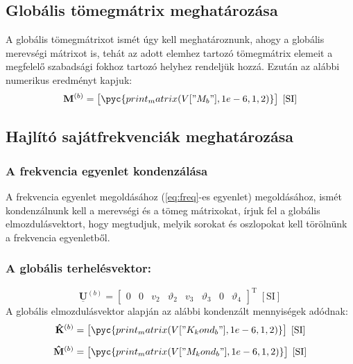 \documentclass[12pt,a4paper]{article}
\def\mx#1{\mathbf{#1}}
\def\vec#1{\underline{\mathbf{#1}}}
\def\ui#1{\left(#1\right)}
\def\SI{\; \left[\mathrm{SI}\right]}
\begin{document}
\subsection{Globális tömegmátrix meghatározása}
A globális tömegmátrixot ismét úgy kell meghatároznunk, ahogy a globális merevségi mátrixot is,
tehát az adott elemhez tartozó tömegmátrix elemeit a megfelelő szabadsági
fokhoz tartozó helyhez rendeljük hozzá. Ezután az alábbi numerikus eredményt kapjuk:
\begin{equation*}
    \mx{M}^{\ui{b}}=
    \begin{bmatrix}
        \pyc{print_matrix(V["M_b"],1e-6,1,2)}
    \end{bmatrix} \SI
\end{equation*}
\subsection{Hajlító sajátfrekvenciák meghatározása}
\subsubsection{A frekvencia egyenlet kondenzálása}
A frekvencia egyenlet megoldásához (\eqref{eq:freq}-es egyenlet) megoldásához, ismét
kondenzálnunk kell a merevségi és a tömeg mátrixokat, írjuk fel a globális elmozdulásvektort, hogy
megtudjuk, melyik sorokat és oszlopokat kell törölnünk a frekvencia egyenletből.
\subsubsection*{A globális terhelésvektor:}
\begin{equation*}
    \vec{U}^{\ui{b}}=
    \begin{bmatrix}
        0 & 0 & v_2 & \vartheta_2 & v_3 & \vartheta_3 & 0 & \vartheta_4
    \end{bmatrix}^{\mathrm{T}} \SI
\end{equation*}
\noindent A globális elmozdulásvektor alapján az alábbi kondenzált mennyiségek adódnak:
\begin{align*}
    \mx{\hat{K}}^{\ui{b}} & =
    \begin{bmatrix}
        \pyc{print_matrix(V["K_kond_b"],1e-6,1,2)}
    \end{bmatrix} \SI \\[2mm]
    \mx{\hat{M}}^{\ui{b}} & =
    \begin{bmatrix}
        \pyc{print_matrix(V["M_kond_b"],1e-6,1,2)}
    \end{bmatrix} \SI
\end{align*}
\end{document}
